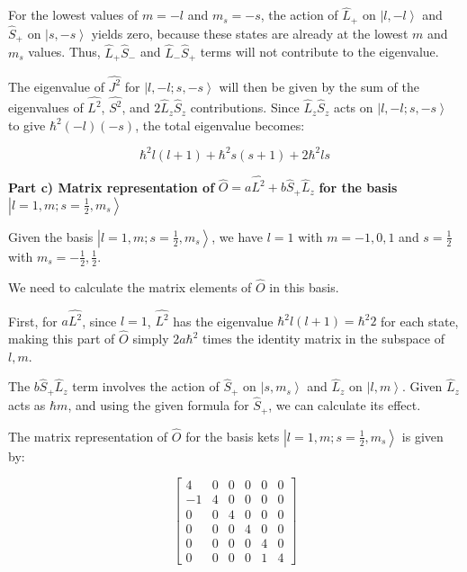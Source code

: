 \documentclass[a4paper,11pt]{article}
\begin{document}
For the lowest values of \( m = -l \) and \( m_{s} = -s \), the action of \( \hat{L}_{+} \) on \( \left|l, -l \right> \) and \( \hat{S}_{+} \) on \( \left|s, -s \right> \) yields zero, because these states are already at the lowest \( m \) and \( m_{s} \) values. Thus, \( \hat{L}_{+}\hat{S}_{-} \) and \( \hat{L}_{-}\hat{S}_{+} \) terms will not contribute to the eigenvalue.

The eigenvalue of \( \hat{J^{2}} \) for \( \left|l, -l; s, -s \right> \) will then be given by the sum of the eigenvalues of \( \hat{L^{2}} \), \( \hat{S^{2}} \), and \( 2\hat{L}_{z}\hat{S}_{z} \) contributions. Since \( \hat{L}_{z}\hat{S}_{z} \) acts on \( \left|l, -l; s, -s \right> \) to give \( \hbar^2 (-l)(-s) \), the total eigenvalue becomes:

\[ \hbar^2 l(l+1) + \hbar^2 s(s+1) + 2\hbar^2 ls \]

\textbf{Part c) Matrix representation of} \( \hat{O} = a\hat{L^{2}} + b\hat{S}_{+}\hat{L}_{z} \) \textbf{for the basis} \( \left|l=1, m; s=\frac{1}{2}, m_{s} \right> \)

Given the basis \( \left|l=1, m; s=\frac{1}{2}, m_{s} \right> \), we have \( l=1 \) with \( m = -1, 0, 1 \) and \( s=\frac{1}{2} \) with \( m_{s} = -\frac{1}{2}, \frac{1}{2} \).

We need to calculate the matrix elements of \( \hat{O} \) in this basis.

First, for \( a\hat{L^{2}} \), since \( l=1 \), \( \hat{L^{2}} \) has the eigenvalue \( \hbar^2 l(l+1) = \hbar^2 2 \) for each state, making this part of \( \hat{O} \) simply \( 2a\hbar^2 \) times the identity matrix in the subspace of \( l, m \).

The \( b\hat{S}_{+}\hat{L}_{z} \) term involves the action of \( \hat{S}_{+} \) on \( \left|s, m_{s} \right> \) and \( \hat{L}_{z} \) on \( \left|l, m \right> \). Given \( \hat{L}_{z} \) acts as \( \hbar m \), and using the given formula for \( \hat{S}_{+} \), we can calculate its effect.

The matrix representation of \( \hat{O} \) for the basis kets \( \left|l=1, m; s=\frac{1}{2}, m_{s} \right> \) is given by:

\[
\begin{bmatrix}
4 & 0 & 0 & 0 & 0 & 0 \\
-1 & 4 & 0 & 0 & 0 & 0 \\
0 & 0 & 4 & 0 & 0 & 0 \\
0 & 0 & 0 & 4 & 0 & 0 \\
0 & 0 & 0 & 0 & 4 & 0 \\
0 & 0 & 0 & 0 & 1 & 4
\end{bmatrix}
\]
\end{document}
